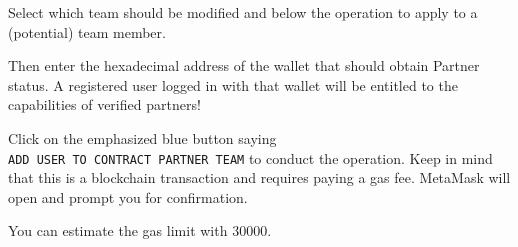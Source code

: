 \documentclass[
]{article}
\begin{document}
Select which team should be modified and below the operation to apply to
a (potential) team member.

Then enter the hexadecimal address of the wallet that should obtain
Partner status. A registered user logged in with that wallet will be
entitled to the capabilities of verified partners!

Click on the emphasized blue button saying
\texttt{ADD\ USER\ TO\ CONTRACT\ PARTNER\ TEAM} to conduct the
operation. Keep in mind that this is a blockchain transaction and
requires paying a gas fee. MetaMask will open and prompt you for
confirmation.

You can estimate the gas limit with \(30000\).
\end{document}
